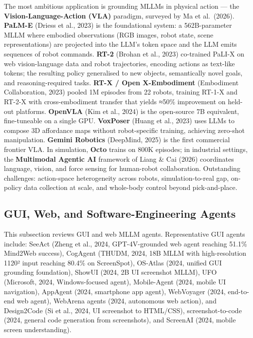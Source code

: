The most ambitious application is grounding MLLMs in physical action --- the \textbf{Vision-Language-Action (VLA)} paradigm, surveyed by Ma et al.~(2026). \textbf{PaLM-E} (Driess et al., 2023) is the foundational system: a 562B-parameter MLLM where embodied observations (RGB images, robot state, scene representations) are projected into the LLM's token space and the LLM emits sequences of robot commands. \textbf{RT-2} (Brohan et al., 2023) co-trained PaLI-X on web vision-language data and robot trajectories, encoding actions as text-like tokens; the resulting policy generalised to new objects, semantically novel goals, and reasoning-required tasks. \textbf{RT-X / Open X-Embodiment} (Embodiment Collaboration, 2023) pooled 1M episodes from 22 robots, training RT-1-X and RT-2-X with cross-embodiment transfer that yields ≈50\% improvement on held-out platforms. \textbf{OpenVLA} (Kim et al., 2024) is the open-source 7B equivalent, fine-tuneable on a single GPU. \textbf{VoxPoser} (Huang et al., 2023) uses LLMs to compose 3D affordance maps without robot-specific training, achieving zero-shot manipulation. \textbf{Gemini Robotics} (DeepMind, 2025) is the first commercial frontier VLA. In simulation, \textbf{Octo} trains on 800K episodes; in industrial settings, the \textbf{Multimodal Agentic AI} framework of Liang \& Cai (2026) coordinates language, vision, and force sensing for human-robot collaboration. Outstanding challenges: action-space heterogeneity across robots, simulation-to-real gap, on-policy data collection at scale, and whole-body control beyond pick-and-place.

\subsection{GUI, Web, and Software-Engineering Agents}\label{gui-web-and-software-engineering-agents}

This subsection reviews GUI and web MLLM agents. Representative GUI agents include: SeeAct (Zheng et al., 2024, GPT-4V-grounded web agent reaching 51.1\% Mind2Web success), CogAgent (THUDM, 2024, 18B MLLM with high-resolution 1120² input reaching 80.4\% on ScreenSpot), OS-Atlas (2024, unified GUI grounding foundation), ShowUI (2024, 2B UI screenshot MLLM), UFO (Microsoft, 2024, Windows-focused agent), Mobile-Agent (2024, mobile UI navigation), AppAgent (2024, smartphone app agent), WebVoyager (2024, end-to-end web agent), WebArena agents (2024, autonomous web action), and Design2Code (Si et al., 2024, UI screenshot to HTML/CSS), screenshot-to-code (2024, general code generation from screenshots), and ScreenAI (2024, mobile screen understanding).

